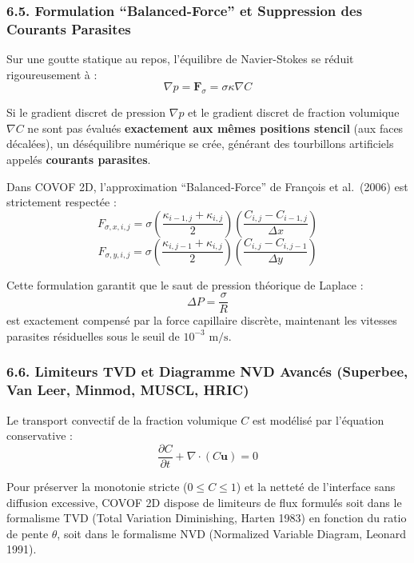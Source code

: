 \documentclass[
  french,
]{article}
\begin{document}
\subsubsection{6.5. Formulation ``Balanced-Force'' et Suppression des
Courants
Parasites}\label{formulation-balanced-force-et-suppression-des-courants-parasites}

Sur une goutte statique au repos, l'équilibre de Navier-Stokes se réduit
rigoureusement à :
\[\nabla p = \mathbf{F}_\sigma = \sigma \kappa \nabla C\]

Si le gradient discret de pression \(\nabla p\) et le gradient discret
de fraction volumique \(\nabla C\) ne sont pas évalués
\textbf{exactement aux mêmes positions stencil} (aux faces décalées), un
déséquilibre numérique se crée, générant des tourbillons artificiels
appelés \textbf{courants parasites}.

Dans COVOF 2D, l'approximation ``Balanced-Force'' de François et
al.~(2006) est strictement respectée :
\[F_{\sigma, x, i, j} = \sigma \left( \frac{\kappa_{i-1, j} + \kappa_{i, j}}{2} \right) \left( \frac{C_{i, j} - C_{i-1, j}}{\Delta x} \right)\]
\[F_{\sigma, y, i, j} = \sigma \left( \frac{\kappa_{i, j-1} + \kappa_{i, j}}{2} \right) \left( \frac{C_{i, j} - C_{i, j-1}}{\Delta y} \right)\]

Cette formulation garantit que le saut de pression théorique de Laplace
: \[\Delta P = \frac{\sigma}{R}\] est exactement compensé par la force
capillaire discrète, maintenant les vitesses parasites résiduelles sous
le seuil de \(10^{-3}\text{ m/s}\).

\subsubsection{6.6. Limiteurs TVD et Diagramme NVD Avancés (Superbee,
Van Leer, Minmod, MUSCL,
HRIC)}\label{limiteurs-tvd-et-diagramme-nvd-avancuxe9s-superbee-van-leer-minmod-muscl-hric}

Le transport convectif de la fraction volumique \(C\) est modélisé par
l'équation conservative :
\[\frac{\partial C}{\partial t} + \nabla \cdot (C \mathbf{u}) = 0\]

Pour préserver la monotonie stricte (\(0 \le C \le 1\)) et la netteté de
l'interface sans diffusion excessive, COVOF 2D dispose de limiteurs de
flux formulés soit dans le formalisme TVD (Total Variation Diminishing,
Harten 1983) en fonction du ratio de pente \(\theta\), soit dans le
formalisme NVD (Normalized Variable Diagram, Leonard 1991).
\end{document}
